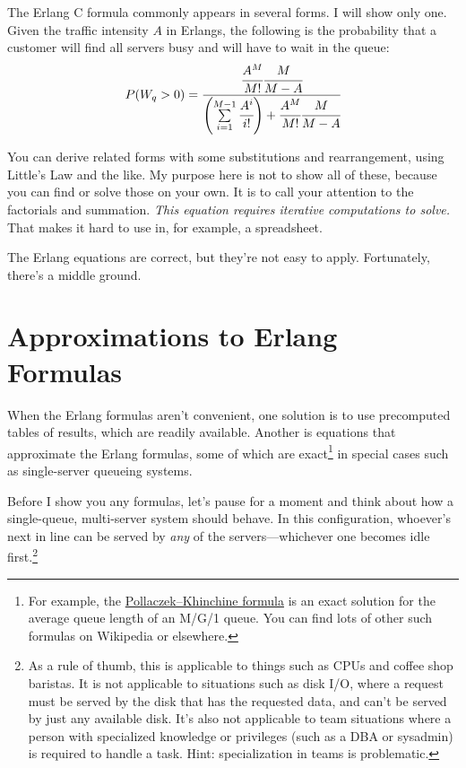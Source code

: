 \documentclass{vivid_layout}
\begin{document}
The Erlang C formula commonly appears in several forms. I will show only one. Given the traffic intensity $A$ in Erlangs, the following is the probability that a customer will find all servers busy and will have to wait in the queue:
\[
P(W_q > 0) = \cfrac{\cfrac{A^M}{M!}\cfrac{M}{M-A}}{\left( \sum\limits_{i=1}^{M-1} \cfrac{A^i}{i!} \right) + \cfrac{A^M}{M!}\cfrac{M}{M-A}}
\]	%

You can derive related forms with some substitutions and rearrangement, using Little's Law and the like. My purpose here is not to show all of these, because you can find or solve those on your own. It is to call your attention to the factorials and summation. {\itshape This equation requires iterative computations to solve.} That makes it hard to use in, for example, a spreadsheet.

The Erlang equations are correct, but they're not easy to apply.
Fortunately, there's a middle ground.

\section{Approximations to Erlang Formulas}

When the Erlang formulas aren't convenient, one solution is to use precomputed tables of results, which are readily available. Another is equations that approximate the Erlang formulas, some of which are exact\footnote{For example, the \href{https://en.wikipedia.org/wiki/Pollaczek\%E2\%80\%93Khinchine_formula}{Pollaczek–Khinchine formula} is an exact solution for the average queue length of an M/G/1 queue. You can find lots of other such formulas on Wikipedia or elsewhere.} in special cases such as single-server queueing systems.

Before I show you any formulas, let's pause for a moment and think about how a single-queue, multi-server system should behave. In this configuration, whoever's next in line can be served by {\itshape any} of the servers---whichever one becomes idle first.\footnote{As a rule of thumb, this is applicable to things such as CPUs and coffee shop baristas. It is not applicable to situations such as disk I/O, where a request must be served by the disk that has the requested data, and can't be served by just any available disk. It's also not applicable to team situations where a person with specialized knowledge or privileges (such as a DBA or sysadmin) is required to handle a task. Hint: specialization in teams is problematic.}
\end{document}

